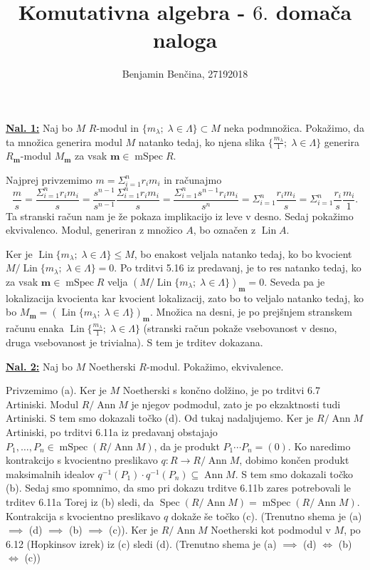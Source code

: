 \documentclass[a4paper, 12pt]{article}
\title{Komutativna algebra - $6.$ domača naloga}
\author{Benjamin Benčina, 27192018}
\DeclareMathOperator{\Lin}{Lin}
\DeclareMathOperator{\Ann}{Ann}
\DeclareMathOperator{\Spec}{Spec}
\DeclareMathOperator{\mSpec}{mSpec}
\begin{document}
\maketitle

\underline{\textbf{Nal. 1:}}
Naj bo $M$ $R$-modul in $\lbrace m_\lambda ; \; \lambda \in \Lambda\rbrace \subset M$ neka podmnožica.
Pokažimo, da ta množica generira modul $M$ natanko tedaj, ko njena slika $\lbrace \frac{m_\lambda}{1} ;\; \lambda \in \Lambda\rbrace$ generira $R_\mathbf{m}$-modul $M_\mathbf{m}$ za vsak $\mathbf{m} \in \mSpec R$. 

Najprej privzemimo $m = \Sigma_{i=1}^{n}r_im_i$ in računajmo
\[
\frac{m}{s} = \frac{\Sigma_{i=1}^{n}r_im_i}{s} = \frac{s^{n-1}}{s^{n-1}} \frac{\Sigma_{i=1}^{n}r_im_i}{s} = \frac{\Sigma_{i=1}^{n}s^{n-1}r_im_i}{s^n} = \Sigma_{i=1}^n \frac{r_im_i}{s} = \Sigma_{i=1}^n \frac{r_i}{s}\frac{m_i}{1}.
\]
Ta stranski račun nam je že pokaza implikacijo iz leve v desno.
Sedaj pokažimo ekvivalenco. Modul, generiran z množico $A$, bo označen z $\Lin A$.

Ker je $\Lin\lbrace m_\lambda ;\;\lambda \in \Lambda\rbrace \leq M$, bo enakost veljala natanko tedaj, ko bo kvocient $M/\Lin\lbrace m_\lambda ;\;\lambda \in \Lambda\rbrace = 0$. Po trditvi 5.16 iz predavanj, je to res natanko tedaj, ko za vsak $\mathbf{m} \in \mSpec R$ velja $\left(M/\Lin\lbrace m_\lambda ;\;\lambda \in \Lambda\rbrace\right)_\mathbf{m} = 0$. Seveda pa je lokalizacija kvocienta kar kvocient lokalizacij, zato bo to veljalo natanko tedaj, ko bo $M_\mathbf{m} = (\Lin\lbrace m_\lambda ;\;\lambda \in \Lambda\rbrace)_\mathbf{m}$. Množica na desni, je po prejšnjem stranskem računu enaka $\Lin\lbrace \frac{m_\lambda}{1} ;\; \lambda \in \Lambda\rbrace$ (stranski račun pokaže vsebovanost v desno, druga vsebovanost je trivialna). S tem je trditev dokazana.

\underline{\textbf{Nal. 2:}}
Naj bo $M$ Noetherski $R$-modul. Pokažimo, ekvivalence.

Privzemimo (a). Ker je $M$ Noetherski s končno dolžino, je po trditvi 6.7 Artiniski. Modul $R/\Ann M$ je njegov podmodul, zato je po ekzaktnosti tudi Artiniski. S tem smo dokazali točko (d). Od tukaj nadaljujemo. Ker je $R/\Ann M$ Artiniski, po trditvi 6.11a iz predavanj obstajajo $P_1,\dots,P_n \in \mSpec (R/\Ann M)$, da je produkt $P_1\cdots P_n = (0)$. Ko naredimo kontrakcijo s kvocientno preslikavo $q\colon R \to R/\Ann M$, dobimo končen produkt maksimalnih idealov $q^{-1}(P_1)\cdot q^{-1}(P_n) \subseteq \Ann M$. S tem smo dokazali točko (b). Sedaj smo spomnimo, da smo pri dokazu trditve 6.11b zares potrebovali le trditev 6.11a Torej iz (b) sledi, da $\Spec (R/\Ann M) = \mSpec (R/\Ann M)$. Kontrakcija s kvocientno preslikavo $q$ dokaže še točko (c).
(Trenutno shema je (a) $\implies$ (d) $\implies$ (b) $\implies$ (c)). Ker je $R/\Ann M$ Noetherski kot podmodul v $M$, po 6.12 (Hopkinsov izrek) iz (c) sledi (d).
(Trenutno shema je (a) $\implies$ (d) $\iff$ (b) $\iff$ (c))
\end{document}
